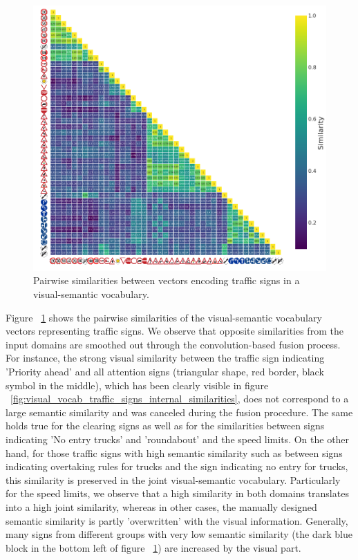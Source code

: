 \begin{figure}[t]
    \centering
    \includegraphics[width=0.8\linewidth]{imgs/visual_semantic_vocab_traffic_signs_internal_similarities.png}
    \caption{Pairwise similarities between vectors encoding traffic signs in a visual-semantic vocabulary.}
    \label{fig:visual_semantic_vocab_traffic_signs_internal_similarities}
\end{figure}

Figure ~\ref{fig:visual_semantic_vocab_traffic_signs_internal_similarities} shows the pairwise similarities of the visual-semantic vocabulary vectors representing traffic signs.
We observe that opposite similarities from the input domains are smoothed out through the convolution-based fusion process.
For instance, the strong visual similarity between the traffic sign indicating 'Priority ahead' and all attention signs (triangular shape, red border, black symbol in the middle), which has been clearly visible in figure ~\ref{fig:visual_vocab_traffic_signs_internal_similarities}, does not correspond to a large semantic similarity and was canceled during the fusion procedure.
The same holds true for the clearing signs as well as for the similarities between signs indicating 'No entry trucks' and 'roundabout' and the speed limits.
On the other hand, for those traffic signs with high semantic similarity such as between signs indicating overtaking rules for trucks and the sign indicating no entry for trucks, this similarity is preserved in the joint visual-semantic vocabulary. 
Particularly for the speed limits, we observe that a high similarity in both domains translates into a high joint similarity, whereas in other cases, the manually designed semantic similarity is partly 'overwritten' with the visual information.
Generally, many signs from different groups with very low semantic similarity (the dark blue block in the bottom left of figure ~\ref{fig:visual_semantic_vocab_traffic_signs_internal_similarities}) are increased by the visual part. 

